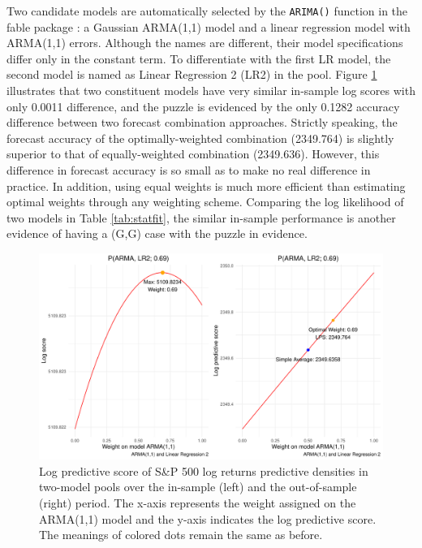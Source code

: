 \documentclass{monashthesis}
\begin{document}
Two candidate models are automatically selected by the \texttt{ARIMA()} function in the fable package \autocite{fpp23}: a Gaussian ARMA(1,1) model and a linear regression model with ARMA(1,1) errors. Although the names are different, their model specifications differ only in the constant term. To differentiate with the first LR model, the second model is named as Linear Regression 2 (LR2) in the pool. Figure \ref{fig:stat} illustrates that two constituent models have very similar in-sample log scores with only 0.0011 difference, and the puzzle is evidenced by the only 0.1282 accuracy difference between two forecast combination approaches. Strictly speaking, the forecast accuracy of the optimally-weighted combination (2349.764) is slightly superior to that of equally-weighted combination (2349.636). However, this difference in forecast accuracy is so small as to make no real difference in practice. In addition, using equal weights is much more efficient than estimating optimal weights through any weighting scheme. Comparing the log likelihood of two models in Table \ref{tab:statfit}, the similar in-sample performance is another evidence of having a (G,G) case with the puzzle in evidence.

\vspace{7mm}

\begin{figure}[ht]
\centering
\includegraphics[scale=0.6]{figures/SP500_stationary.pdf}
\caption{Log predictive score of S\&P 500 log returns predictive densities in two-model pools over the in-sample (left) and the out-of-sample (right) period. The x-axis represents the weight assigned on the ARMA(1,1) model and the y-axis indicates the log predictive score. The meanings of colored dots remain the same as before.}
\label{fig:stat}
\end{figure}
\end{document}
